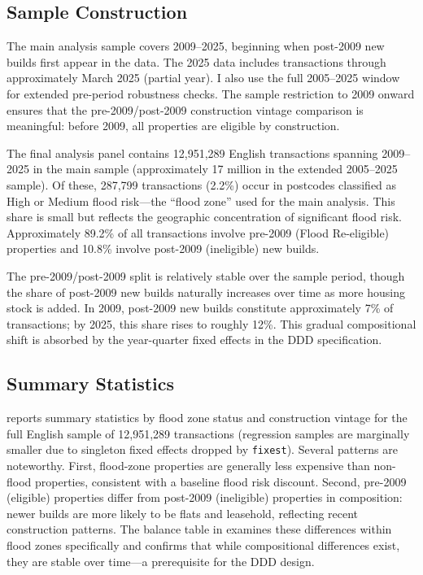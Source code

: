 \documentclass[12pt]{article}
\begin{document}
\subsection{Sample Construction}

The main analysis sample covers 2009--2025, beginning when post-2009 new builds first appear in the data. The 2025 data includes transactions through approximately March 2025 (partial year). I also use the full 2005--2025 window for extended pre-period robustness checks. The sample restriction to 2009 onward ensures that the pre-2009/post-2009 construction vintage comparison is meaningful: before 2009, all properties are eligible by construction.

The final analysis panel contains 12,951,289 English transactions spanning 2009--2025 in the main sample (approximately 17 million in the extended 2005--2025 sample). Of these, 287,799 transactions (2.2\%) occur in postcodes classified as High or Medium flood risk---the ``flood zone'' used for the main analysis. This share is small but reflects the geographic concentration of significant flood risk. Approximately 89.2\% of all transactions involve pre-2009 (Flood Re-eligible) properties and 10.8\% involve post-2009 (ineligible) new builds.

The pre-2009/post-2009 split is relatively stable over the sample period, though the share of post-2009 new builds naturally increases over time as more housing stock is added. In 2009, post-2009 new builds constitute approximately 7\% of transactions; by 2025, this share rises to roughly 12\%. This gradual compositional shift is absorbed by the year-quarter fixed effects in the DDD specification.

\subsection{Summary Statistics}



 reports summary statistics by flood zone status and construction vintage for the full English sample of 12,951,289 transactions (regression samples are marginally smaller due to singleton fixed effects dropped by \texttt{fixest}). Several patterns are noteworthy. First, flood-zone properties are generally less expensive than non-flood properties, consistent with a baseline flood risk discount. Second, pre-2009 (eligible) properties differ from post-2009 (ineligible) properties in composition: newer builds are more likely to be flats and leasehold, reflecting recent construction patterns. The balance table in  examines these differences within flood zones specifically and confirms that while compositional differences exist, they are stable over time---a prerequisite for the DDD design.
\end{document}
